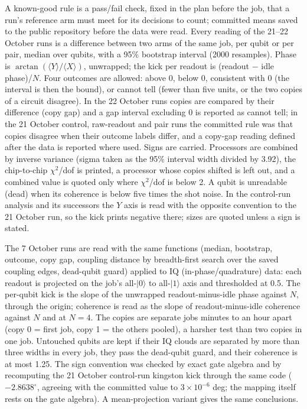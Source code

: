 \documentclass[reprint,amsmath,amssymb,aps,superscriptaddress,nofootinbib]{revtex4-2}
\begin{document}
A known-good rule is a pass/fail check, fixed in the plan before the job, that a run's reference arm must meet for its decisions to count; committed means saved to the public repository before the data were read. Every reading of the 21--22 October runs is a difference between two arms of the same job, per qubit or per pair, median over qubits, with a 95\% bootstrap interval (2000 resamples). Phase is $\arctan(\langle Y\rangle/\langle X\rangle)$, unwrapped; the kick per readout is (readout $-$ idle phase)/$N$. Four outcomes are allowed: above 0, below 0, consistent with 0 (the interval is then the bound), or cannot tell (fewer than five units, or the two copies of a circuit disagree). In the 22 October runs copies are compared by their difference (copy gap) and a gap interval excluding 0 is reported as cannot tell; in the 21 October control, raw-readout and pair runs the committed rule was that copies disagree when their outcome labels differ, and a copy-gap reading defined after the data is reported where used. Signs are carried. Processors are combined by inverse variance (sigma taken as the 95\% interval width divided by 3.92), the chip-to-chip $\chi^2$/dof is printed, a processor whose copies shifted is left out, and a combined value is quoted only where $\chi^2$/dof is below 2. A qubit is unreadable (dead) when its coherence is below five times the shot noise. In the control-run analysis and its successors the $Y$ axis is read with the opposite convention to the 21 October run, so the kick prints negative there; sizes are quoted unless a sign is stated.

The 7 October runs are read with the same functions (median, bootstrap, outcome, copy gap, coupling distance by breadth-first search over the saved coupling edges, dead-qubit guard) applied to IQ (in-phase/quadrature) data: each readout is projected on the job's all-$|0\rangle$ to all-$|1\rangle$ axis and thresholded at 0.5. The per-qubit kick is the slope of the unwrapped readout-minus-idle phase against $N$, through the origin; coherence is read as the slope of readout-minus-idle coherence against $N$ and at $N=4$. The copies are separate jobs minutes to an hour apart (copy 0 = first job, copy 1 = the others pooled), a harsher test than two copies in one job. Untouched qubits are kept if their IQ clouds are separated by more than three widths in every job, they pass the dead-qubit guard, and their coherence is at most 1.25. The sign convention was checked by exact gate algebra and by recomputing the 21 October control-run kingston kick through the same code ($-2.8638^\circ$, agreeing with the committed value to $3\times10^{-6}$ deg; the mapping itself rests on the gate algebra). A mean-projection variant gives the same conclusions.
\end{document}
